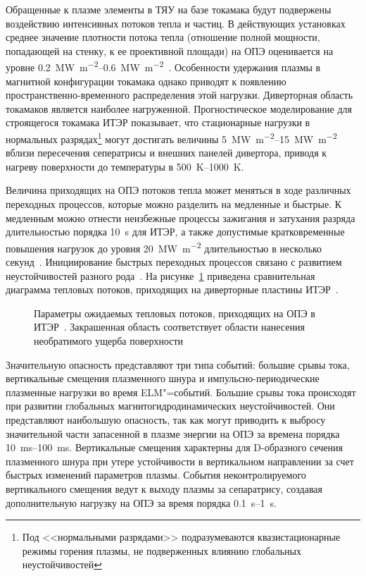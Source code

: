 Обращенные к плазме элементы в ТЯУ на базе токамака будут подвержены воздействию интенсивных потоков тепла и частиц. В действующих установках среднее значение плотности потока тепла (отношение полной мощности, попадающей на стенку, к ее проективной площади) на ОПЭ оценивается на уровне \SIrange{0.2}{0.6}{\mega\watt\per\metre\squared}~\cite{Mazul2021}. Особенности удержания плазмы в магнитной конфигурации токамака однако приводят к появлению пространственно-временного распределения этой нагрузки. Диверторная область токамаков является наиболее нагруженной. Прогностическое моделирование для строящегося токамака ИТЭР показывает, что стационарные нагрузки в нормальных разрядах\footnote{Под <<нормальными разрядами>> подразумеваются квазистационарные режимы горения плазмы, не подверженных влиянию глобальных неустойчивостей} могут достигать величины \SIrange{5}{15}{\mega\watt\per\meter\squared}~\cite{Pitts2019,Orrico2023} вблизи пересечения сеператрисы и внешних панелей дивертора, приводя к нагреву поверхности до температуры в \SIrange{500}{1000}{\kelvin}.

Величина приходящих на ОПЭ потоков тепла может меняться в ходе различных переходных процессов, которые можно разделить на медленные и быстрые. К медленным можно отнести неизбежные процессы зажигания и затухания разряда длительностью порядка \SI{10}{\second} для ИТЭР, а также допустимые кратковременные повышения нагрузок до уровня \SI{20}{\mega\watt\per\meter\squared} длительностью в несколько секунд~\cite{Pitts2017}. Инициирование быстрых переходных процессов связано с развитием неустойчивостей разного рода~\cite{hender2007mhd}. На рисунке~\cref{fig:ch1/Heat_loads_diagram} приведена сравнительная диаграмма тепловых потоков, приходящих на диверторные пластины ИТЭР~\cite{Linke2019}.

\begin{figure}[ht]
    \caption{Параметры ожидаемых тепловых потоков, приходящих на ОПЭ в ИТЭР~\cite{Linke2019}. Закрашенная область соответствует области нанесения необратимого ущерба поверхности}\label{fig:ch1/Heat_loads_diagram}
\end{figure}

Значительную опасность представляют три типа событий: большие срывы тока, вертикальные смещения плазменного шнура и импульсно-периодические плазменные нагрузки во время ELM"=событий. Большие срывы тока происходят при развитии глобальных магнитогидродинамических неустойчивостей. Они представляют наибольшую опасность, так как могут приводить к выбросу значительной части запасенной в плазме энергии на ОПЭ за времена порядка \SIrange{10}{100}{\milli\second}. Вертикальные смещения характерны для D-образного сечения плазменного шнура при утере устойчивости в вертикальном направлении за счет быстрых изменений параметров плазмы. События неконтролируемого вертикального смещения ведут к выходу плазмы за сепаратрису, создавая дополнительную нагрузку на ОПЭ за время порядка \SIrange{0.1}{1}{\second}. 

